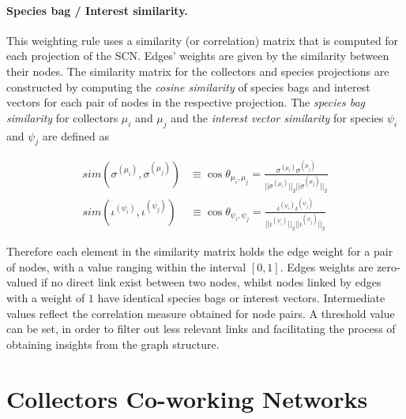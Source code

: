 \paragraph*{Species bag / Interest similarity.}
This weighting rule uses a similarity (or correlation) matrix that is computed for each projection of the SCN. Edges' weights are given by the similarity between their nodes. The similarity matrix for the collectors and species projections are constructed by computing the  \textit{cosine similarity} of species bags and interest vectors  for each pair of nodes in the respective projection. 
The \textit{species bag similarity} for collectors $\mu_i$ and $\mu_j$ and the \textit{interest vector similarity} for species $\psi_i$ and $\psi_j$ are defined as

\begin{equation}
\begin{split}
sim(\sigma^{(\mu_i)},\sigma^{(\mu_j)}) &\equiv
\cos \theta_{\mu_i,\mu_j} =
\frac{  \sigma^{(\mu_i)} \sigma^{(\mu_j)}  }{  ||\sigma^{(\mu_i)}||_2  ||\sigma^{(\mu_j)}||_2  } \\
sim(\iota^{(\psi_i)},\iota^{(\psi_j)}) &\equiv
\cos \theta_{\psi_i,\psi_j} =
\frac{  \iota^{(\psi_i)} \iota^{(\psi_j)}  }{  ||\iota^{(\psi_i)}||_2  ||\iota^{(\psi_j)}||_2  } 
\end{split}
\end{equation}

Therefore each element in the similarity matrix holds the edge weight for a pair of nodes, with a value ranging within the interval $[0,1]$. Edges weights are zero-valued if no direct link exist between two nodes,  whilst nodes linked by edges with a weight of $1$ have identical species bags or interest vectors. Intermediate values reflect the correlation measure obtained for node pairs. A threshold value can be set, in order to filter out less relevant links and facilitating the process of obtaining insights from the graph structure.


\section{Collectors Co-working Networks}


